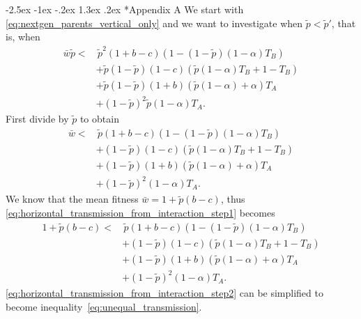 \documentclass[12pt]{extarticle}
\makeatletter
\renewcommand\section{\@startsection {section}{1}{\z@}%
     {-2.5ex \@plus -1ex \@minus -.2ex}%
     {1.3ex \@plus.2ex}%
    {\Large\bfseries}}
\makeatother
\begin{document}
\section*{Appendix A} 
We start with \autoref{eq:nextgen_parents_vertical_only} and we want to investigate when $\tilde{p}< \tilde{p}'$, that is, when 
\begin{equation} \label{eq:horizontal_transmission_from_interaction_step0}
\begin{aligned}
\bar{w}\tilde{p} < & \, \tilde{p}^2 (1+b-c) (1 - (1-\tilde{p}) (1-\alpha) T_B) \\
& + \tilde{p}(1-\tilde{p}) (1-c) (\tilde{p} (1-\alpha) T_B + 1 - T_B) \\
& + \tilde{p}(1-\tilde{p}) (1+b) (\tilde{p} (1-\alpha) + \alpha) T_A \\
& + (1-\tilde{p})^2 \tilde{p} (1-\alpha) T_A .
\end{aligned}
\end{equation}
First divide by $\tilde{p}$ to obtain
\begin{equation} \label{eq:horizontal_transmission_from_interaction_step1} 
\begin{aligned} 
  \bar{w} < & \, \tilde{p}(1+b-c) (1 - (1-\tilde{p}) (1-\alpha) T_B) \\
  & + (1-\tilde{p}) (1-c) (\tilde{p} (1-\alpha) T_B + 1 - T_B) \\
  & + (1-\tilde{p}) (1+b) (\tilde{p} (1-\alpha) + \alpha) T_A \\
  & + (1-\tilde{p})^2 (1-\alpha) T_A .
\end{aligned}
\end{equation}
We know that the mean fitness $\bar{w} = 1 + \tilde{p}(b-c)$, thus \autoref{eq:horizontal_transmission_from_interaction_step1} becomes
\begin{equation} \label{eq:horizontal_transmission_from_interaction_step2} 
\begin{aligned} 
  1 + \tilde{p}(b-c) < & \, \tilde{p}(1+b-c) (1 - (1-\tilde{p}) (1-\alpha) T_B) \\
  & + (1-\tilde{p}) (1-c) (\tilde{p} (1-\alpha) T_B + 1 - T_B) \\
  & + (1-\tilde{p}) (1+b) (\tilde{p} (1-\alpha) + \alpha) T_A \\
  & + (1-\tilde{p})^2 (1-\alpha) T_A .
\end{aligned}
\end{equation}
\autoref{eq:horizontal_transmission_from_interaction_step2} can be simplified to become inequality~\autoref{eq:unequal_transmission}.
\end{document}
